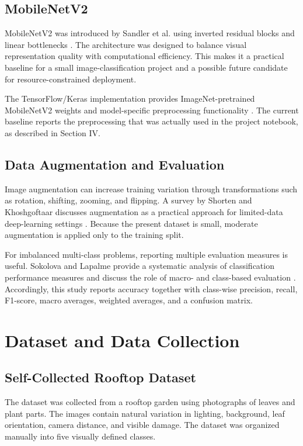 \documentclass[conference]{IEEEtran}
\begin{document}
\subsection{MobileNetV2}
MobileNetV2 was introduced by Sandler et al. using inverted residual blocks and linear bottlenecks \cite{sandler2018}. The architecture was designed to balance visual representation quality with computational efficiency. This makes it a practical baseline for a small image-classification project and a possible future candidate for resource-constrained deployment.

The TensorFlow/Keras implementation provides ImageNet-pretrained MobileNetV2 weights and model-specific preprocessing functionality \cite{tensorflow_mobilenetv2}. The current baseline reports the preprocessing that was actually used in the project notebook, as described in Section IV.

\subsection{Data Augmentation and Evaluation}
Image augmentation can increase training variation through transformations such as rotation, shifting, zooming, and flipping. A survey by Shorten and Khoshgoftaar discusses augmentation as a practical approach for limited-data deep-learning settings \cite{shorten2019}. Because the present dataset is small, moderate augmentation is applied only to the training split.

For imbalanced multi-class problems, reporting multiple evaluation measures is useful. Sokolova and Lapalme provide a systematic analysis of classification performance measures and discuss the role of macro- and class-based evaluation \cite{sokolova2009}. Accordingly, this study reports accuracy together with class-wise precision, recall, F1-score, macro averages, weighted averages, and a confusion matrix.

\section{Dataset and Data Collection}
\subsection{Self-Collected Rooftop Dataset}
The dataset was collected from a rooftop garden using photographs of leaves and plant parts. The images contain natural variation in lighting, background, leaf orientation, camera distance, and visible damage. The dataset was organized manually into five visually defined classes.
\end{document}
